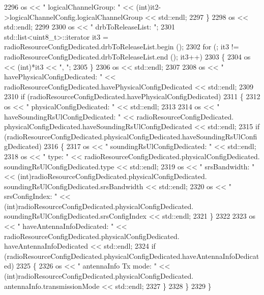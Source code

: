 \begin{DoxyCode}
2296       os << \textcolor{stringliteral}{"         logicalChannelGroup: "} <<  (int)it2->logicalChannelConfig.logicalChannelGroup << 
      std::endl;
2297     \}
2298   os << std::endl;
2299 
2300   os << \textcolor{stringliteral}{"   drbToReleaseList: "};
2301   std::list<uint8\_t>::iterator it3 = radioResourceConfigDedicated.drbToReleaseList.begin ();
2302   \textcolor{keywordflow}{for} (; it3 != radioResourceConfigDedicated.drbToReleaseList.end (); it3++)
2303     \{
2304       os << (int)*it3 << \textcolor{stringliteral}{", "};
2305     \}
2306   os << std::endl;
2307 
2308   os << \textcolor{stringliteral}{"   havePhysicalConfigDedicated: "} << radioResourceConfigDedicated.havePhysicalConfigDedicated << 
      std::endl;
2309 
2310   \textcolor{keywordflow}{if} (radioResourceConfigDedicated.havePhysicalConfigDedicated)
2311     \{
2312       os << \textcolor{stringliteral}{"   physicalConfigDedicated: "} << std::endl;
2313 
2314       os << \textcolor{stringliteral}{"      haveSoundingRsUlConfigDedicated: "} << radioResourceConfigDedicated.
      physicalConfigDedicated.haveSoundingRsUlConfigDedicated << std::endl;
2315       \textcolor{keywordflow}{if} (radioResourceConfigDedicated.physicalConfigDedicated.haveSoundingRsUlConfigDedicated)
2316         \{
2317           os << \textcolor{stringliteral}{"      soundingRsUlConfigDedicated: "} << std::endl;
2318           os << \textcolor{stringliteral}{"         type: "} << radioResourceConfigDedicated.physicalConfigDedicated.
      soundingRsUlConfigDedicated.type << std::endl;
2319           os << \textcolor{stringliteral}{"         srsBandwidth: "} << (int)radioResourceConfigDedicated.physicalConfigDedicated.
      soundingRsUlConfigDedicated.srsBandwidth << std::endl;
2320           os << \textcolor{stringliteral}{"         srsConfigIndex: "} << (\textcolor{keywordtype}{int})radioResourceConfigDedicated.physicalConfigDedicated.
      soundingRsUlConfigDedicated.srsConfigIndex << std::endl;
2321         \}
2322 
2323       os << \textcolor{stringliteral}{"      haveAntennaInfoDedicated: "} << radioResourceConfigDedicated.physicalConfigDedicated.
      haveAntennaInfoDedicated << std::endl;
2324       \textcolor{keywordflow}{if} (radioResourceConfigDedicated.physicalConfigDedicated.haveAntennaInfoDedicated)
2325         \{
2326           os << \textcolor{stringliteral}{"      antennaInfo Tx mode: "} << (int)radioResourceConfigDedicated.physicalConfigDedicated.
      antennaInfo.transmissionMode << std::endl;
2327         \}
2328     \}
2329 \}
\end{DoxyCode}
